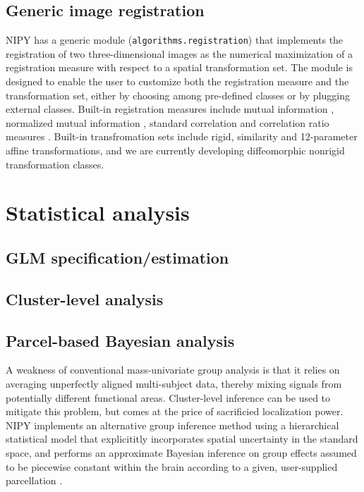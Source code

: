 \documentclass{bioinfo}
\begin{document}
\subsection{Generic image registration}

NIPY has a generic module ({\tt algorithms.registration}) that
implements the registration of two three-dimensional images as the
numerical maximization of a registration measure with respect to a
spatial transformation set. The module is designed to enable the user
to customize both the registration measure and the transformation set,
either by choosing among pre-defined classes or by plugging external
classes. Built-in registration measures include mutual information
\citep{maes:tmi:97}, normalized mutual information
\citep{studholme:pr:98}, standard correlation and correlation ratio
measures \citep{roche:ijist:00}. Built-in transfromation sets include
rigid, similarity and 12-parameter affine transformations, and we are
currently developing diffeomorphic nonrigid transformation classes.





\section{Statistical analysis}

\subsection{GLM specification/estimation}

\subsection{Cluster-level analysis}

\subsection{Parcel-based Bayesian analysis}

A weakness of conventional mass-univariate group analysis is that it
relies on averaging unperfectly aligned multi-subject data, thereby
mixing signals from potentially different functional
areas. Cluster-level inference can be used to mitigate this problem,
but comes at the price of sacrificied localization power. NIPY
implements an alternative group inference method using a hierarchical
statistical model that explicititly incorporates spatial uncertainty
in the standard space, and performs an approximate Bayesian inference
on group effects assumed to be piecewise constant within the brain
according to a given, user-supplied parcellation
\citep{keller:sinica:08,keller:miccai:09}. 
\end{document}
